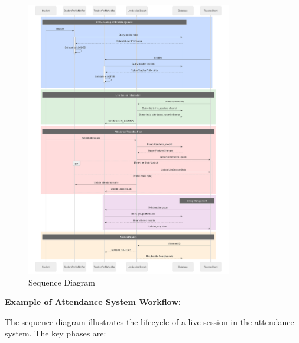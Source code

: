 \documentclass[12pt,a4paper]{report}
\begin{document}
\begin{figure}[htbp]
    \centering
    \includegraphics[width=0.8\textwidth]{images/morsli/sequence.png}
    \caption{Sequence Diagram}
    \label{fig:attendance-system}
\end{figure}

\textbf{Example of Attendance System Workflow:}

The sequence diagram illustrates the lifecycle of a live session in the attendance system. The key phases are:
\end{document}
